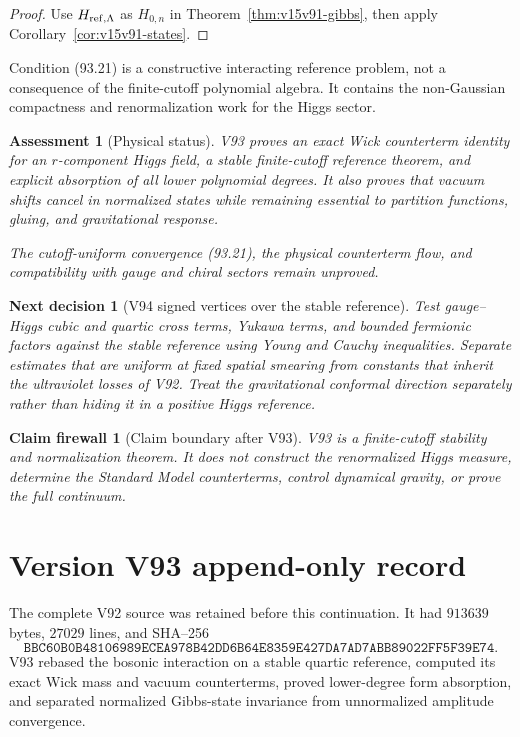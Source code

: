 \documentclass[11pt]{article}
\newtheorem{firewall}[theorem]{Claim firewall}
\newtheorem{decision}[theorem]{Next decision}
\newtheorem{assessment}[theorem]{Assessment}
\theoremstyle{remark}
\begin{document}
\begin{proof}
Use \(H_{{\rm ref},\Lambda}\) as \(H_{0,n}\) in
Theorem~\ref{thm:v15v91-gibbs}, then apply
Corollary~\ref{cor:v15v91-states}.
\end{proof}

Condition (93.21) is a constructive interacting reference problem,
not a consequence of the finite-cutoff polynomial algebra.  It
contains the non-Gaussian compactness and renormalization work for
the Higgs sector.

\begin{assessment}[Physical status]
\label{ass:v15v93-status}
V93 proves an exact Wick counterterm identity for an
\(r\)-component Higgs field, a stable finite-cutoff reference
theorem, and explicit absorption of all lower polynomial degrees.
It also proves that vacuum shifts cancel in normalized states while
remaining essential to partition functions, gluing, and
gravitational response.

The cutoff-uniform convergence (93.21), the physical counterterm
flow, and compatibility with gauge and chiral sectors remain
unproved.
\end{assessment}

\begin{decision}[V94 signed vertices over the stable reference]
\label{dec:v15v93-next}
Test gauge--Higgs cubic and quartic cross terms, Yukawa terms, and
bounded fermionic factors against the stable reference using
Young and Cauchy inequalities.  Separate estimates that are uniform
at fixed spatial smearing from constants that inherit the
ultraviolet losses of V92.  Treat the gravitational conformal
direction separately rather than hiding it in a positive Higgs
reference.
\end{decision}

\begin{firewall}[Claim boundary after V93]
\label{fire:v15v93}
V93 is a finite-cutoff stability and normalization theorem.  It
does not construct the renormalized Higgs measure, determine the
Standard Model counterterms, control dynamical gravity, or prove
the full continuum.
\end{firewall}

\section*{Version V93 append-only record}
The complete V92 source was retained before this continuation.  It
had \(913639\) bytes, \(27029\) lines, and SHA--256
\[
 \texttt{BBC60B0B48106989ECEA978B42DD6B64E8359E427DA7AD7ABB89022FF5F39E74}.
\]
V93 rebased the bosonic interaction on a stable quartic reference,
computed its exact Wick mass and vacuum counterterms, proved
lower-degree form absorption, and separated normalized Gibbs-state
invariance from unnormalized amplitude convergence.
\end{document}
